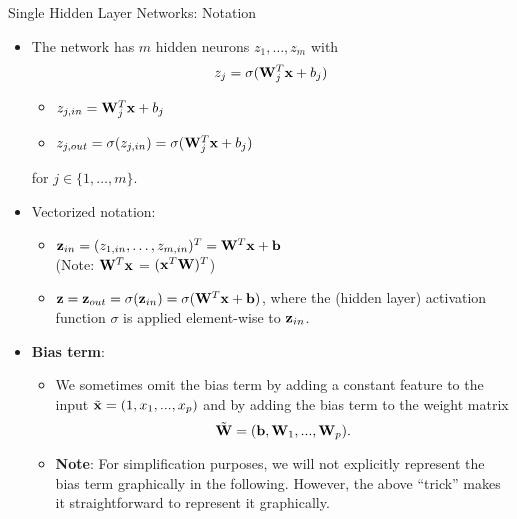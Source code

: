 \begin{vbframe}{Single Hidden Layer Networks: Notation}
  \begin{itemize}
    \vspace{4mm}
    \item The network has $m$ hidden neurons $z_1, \dots, z_m$ with
    $$ z_j = \sigma(\mathbf{W}_j^T \mathbf{x} + b_j)$$
    \vspace{-0.5cm}
    \begin{itemize}
    \item $z_{j,in}  = \mathbf{W}_j^T \mathbf{x} + b_j$
    \vspace{2mm}
    \item $z_{j,out} = \sigma(z_{j,in}) = \sigma(\mathbf{W}_j^T \mathbf{x} + b_j)$
    \end{itemize}
    \vspace{4mm}
    for $j \in \{1,\ldots,m\}$.
    \vspace{4mm}

\item Vectorized notation:
\begin{itemize}
\item $ \mathbf{z}_{in} = (z_{1,in}, \dots, z_{m,in})^T = \mathbf{W}^T \mathbf{x} + \mathbf{b}$ \\ (Note: $\mathbf{W}^T \mathbf{x}$ = $(\mathbf{x}^T \mathbf{W})^T$)
\item $ \mathbf{z} = \mathbf{z}_{out} = \sigma(\mathbf{z}_{in}) = \sigma(\mathbf{W}^T \mathbf{x} + \mathbf{b})$, where the (hidden layer) activation function $\sigma$ is applied element-wise to $\mathbf{z}_{in}$.  
\end{itemize}
\framebreak
\item \textbf{Bias term}:         
\begin{itemize}
\item We sometimes omit the bias term by adding a constant feature to the input $\tilde{\mathbf{x}} = (1, x_1, ..., x_p)$ and by adding the bias term to the weight matrix 
$$\tilde{\mathbf{W}} = (\mathbf{b}, \mathbf{W}_1, ..., \mathbf{W}_p).$$ 
\item \textbf{Note}: For simplification purposes, we will not explicitly represent the bias term graphically in the following. However, the above \enquote{trick} makes it straightforward to represent it graphically. 
\end{itemize}
\end{itemize}
\framebreak


\end{vbframe}
